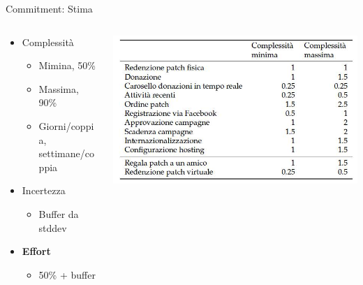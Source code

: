 \documentclass[compress, red, 14pt]{beamer}
\begin{document}
	\begin{frame}{Commitment: Stima}
		
		\begin{columns}[T]
		    \begin{column}{.5\textwidth}
		
				\begin{itemize}
					\item Complessità
					\begin{itemize}
						\item Mimina, 50\%
						\item Massima, 90\%
						\item Giorni/coppia, settimane/coppia
					\end{itemize}
					\item Incertezza
					\begin{itemize}
						\item Buffer da stddev
					\end{itemize}
				\end{itemize}

				\begin{itemize}
					\item \textbf{Effort}
					\begin{itemize}
						\item 50\% + buffer
					\end{itemize}
				\end{itemize}
		
		    \end{column}
		    \begin{column}{.5\textwidth}
				\hspace*{-0.6cm}
			    \includegraphics[scale=0.25]{images/estimates.png}
		    \end{column}
		 \end{columns}
	
	\end{frame}
\end{document}
